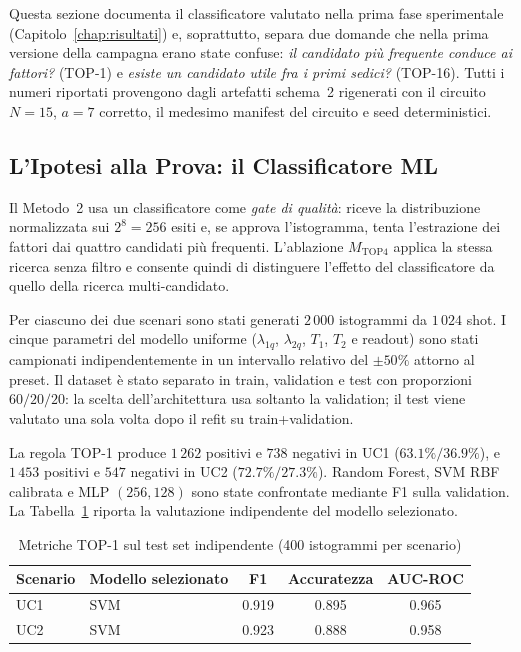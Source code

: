 \begin{onehalfspace}

Questa sezione documenta il classificatore valutato nella prima fase
sperimentale (Capitolo~\ref{chap:risultati}) e, soprattutto, separa due
domande che nella prima versione della campagna erano state confuse:
\emph{il candidato più frequente conduce ai fattori?} (TOP-1) e
\emph{esiste un candidato utile fra i primi sedici?} (TOP-16). Tutti i
numeri riportati provengono dagli artefatti schema~2 rigenerati con il
circuito $N=15$, $a=7$ corretto, il medesimo manifest del circuito e seed
deterministici.

\subsection{L'Ipotesi alla Prova: il Classificatore ML}
\label{sec:risultati_uc_m2}
\label{sec:valutazione_clf}

Il Metodo~2 usa un classificatore come \emph{gate di qualità}: riceve la
distribuzione normalizzata sui $2^8=256$ esiti e, se approva
l'istogramma, tenta l'estrazione dei fattori dai quattro candidati più
frequenti. L'ablazione $M_{\mathrm{TOP4}}$ applica la stessa ricerca senza
filtro e consente quindi di distinguere l'effetto del classificatore da
quello della ricerca multi-candidato.

Per ciascuno dei due scenari sono stati generati $2\,000$ istogrammi da
$1\,024$ shot. I cinque parametri del modello uniforme
($\lambda_{1q}$, $\lambda_{2q}$, $T_1$, $T_2$ e readout) sono stati
campionati indipendentemente in un intervallo relativo del $\pm50\%$
attorno al preset. Il dataset è stato separato in train, validation e
test con proporzioni $60/20/20$: la scelta dell'architettura usa soltanto
la validation; il test viene valutato una sola volta dopo il refit su
train+validation.

La regola TOP-1 produce $1\,262$ positivi e $738$ negativi in UC1
($63.1\%/36.9\%$), e $1\,453$ positivi e $547$ negativi in UC2
($72.7\%/27.3\%$). Random Forest, \ac{SVM} RBF calibrata e \ac{MLP}
$(256,128)$ sono state confrontate mediante F1 sulla validation. La
Tabella~\ref{tab:clf_metrics} riporta la valutazione indipendente del
modello selezionato.

\begin{table}[H]
\centering
\caption{Metriche TOP-1 sul test set indipendente (400 istogrammi per scenario)}
\label{tab:clf_metrics}
\begin{tabular}{llccc}
\toprule
\textbf{Scenario} & \textbf{Modello selezionato} & \textbf{F1} &
\textbf{Accuratezza} & \textbf{\acs{AUC}-ROC} \\
\midrule
UC1 & \ac{SVM} & 0.919 & 0.895 & 0.965 \\
UC2 & \ac{SVM} & 0.923 & 0.888 & 0.958 \\
\bottomrule
\end{tabular}
\end{table}


\end{onehalfspace}

